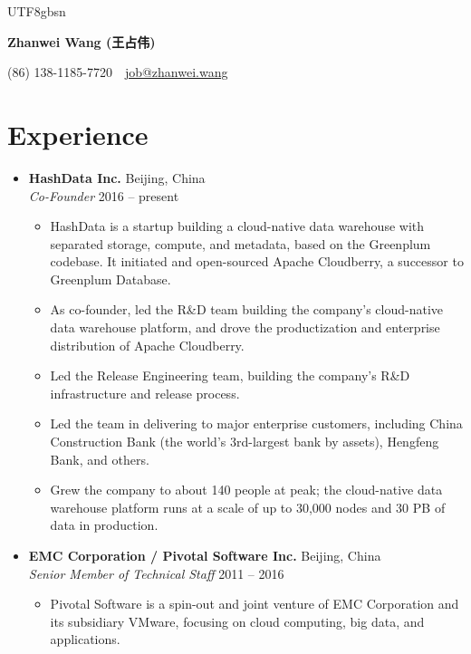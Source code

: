 \documentclass[10pt,a4paper]{article}
\newcommand{\entry}[4]{%
	\textbf{#1} \hfill {\color{subtle}#2}\\
	{\textit{#3}} \hfill {\color{subtle}\small #4}
}
\begin{document}
\begin{CJK}{UTF8}{gbsn}

\begin{center}
	{\fontsize{20}{22}\selectfont\bfseries\color{accent} Zhanwei Wang \normalsize(王占伟)}

	\vspace{0.25em}
	{\small\color{subtle}
		(86) 138-1185-7720
		\,\textbar\,
		\href{mailto:job@zhanwei.wang}{job@zhanwei.wang}
	}
\end{center}
\vspace{-0.8em}

\section*{Experience}

\begin{itemize}

	\item
	\entry{HashData Inc.}{Beijing, China}
		{Co-Founder}{2016 -- present}
	\begin{itemize}
		\item HashData is a startup building a cloud-native data warehouse with separated storage, compute, and metadata, based on the Greenplum codebase. It initiated and open-sourced Apache Cloudberry, a successor to Greenplum Database.

		\item As co-founder, led the R\&D team building the company's cloud-native data warehouse platform, and drove the productization and enterprise distribution of Apache Cloudberry.

		\item Led the Release Engineering team, building the company's R\&D infrastructure and release process.

		\item Led the team in delivering to major enterprise customers, including China Construction Bank (the world's 3rd-largest bank by assets), Hengfeng Bank, and others.

		\item Grew the company to about 140 people at peak; the cloud-native data warehouse platform runs at a scale of up to 30,000 nodes and 30 PB of data in production.
	\end{itemize}

	\item
	\entry{EMC Corporation / Pivotal Software Inc.}{Beijing, China}
		{Senior Member of Technical Staff}{2011 -- 2016}
	\begin{itemize}
		\item Pivotal Software is a spin-out and joint venture of EMC Corporation and its subsidiary VMware, focusing on cloud computing, big data, and applications.


\end{itemize}
\end{itemize}
\end{CJK}
\end{document}
